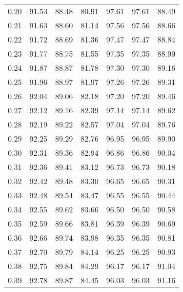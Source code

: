\begin{tabular}{|c|c|c|c|c|c|c|}
      0.20 &     91.53 &     88.48 &      80.91 &   97.61 &      97.61 &         88.49 \\
      0.21 &     91.63 &     88.60 &      81.14 &   97.56 &      97.56 &         88.66 \\
      0.22 &     91.72 &     88.69 &      81.36 &   97.47 &      97.47 &         88.84 \\
      0.23 &     91.77 &     88.75 &      81.55 &   97.35 &      97.35 &         88.99 \\
      0.24 &     91.87 &     88.87 &      81.78 &   97.30 &      97.30 &         89.16 \\
      0.25 &     91.96 &     88.97 &      81.97 &   97.26 &      97.26 &         89.31 \\
      0.26 &     92.04 &     89.06 &      82.18 &   97.20 &      97.20 &         89.46 \\
      0.27 &     92.12 &     89.16 &      82.39 &   97.14 &      97.14 &         89.62 \\
      0.28 &     92.19 &     89.22 &      82.57 &   97.04 &      97.04 &         89.76 \\
      0.29 &     92.25 &     89.29 &      82.76 &   96.95 &      96.95 &         89.90 \\
      0.30 &     92.31 &     89.36 &      82.94 &   96.86 &      96.86 &         90.04 \\
      0.31 &     92.36 &     89.41 &      83.12 &   96.73 &      96.73 &         90.18 \\
      0.32 &     92.42 &     89.48 &      83.30 &   96.65 &      96.65 &         90.31 \\
      0.33 &     92.48 &     89.54 &      83.47 &   96.55 &      96.55 &         90.44 \\
      0.34 &     92.55 &     89.62 &      83.66 &   96.50 &      96.50 &         90.58 \\
      0.35 &     92.59 &     89.66 &      83.81 &   96.39 &      96.39 &         90.69 \\
      0.36 &     92.66 &     89.74 &      83.98 &   96.35 &      96.35 &         90.81 \\
      0.37 &     92.70 &     89.79 &      84.14 &   96.25 &      96.25 &         90.93 \\
      0.38 &     92.75 &     89.84 &      84.29 &   96.17 &      96.17 &         91.04 \\
      0.39 &     92.78 &     89.87 &      84.45 &   96.03 &      96.03 &         91.16 \\

\end{tabular}
